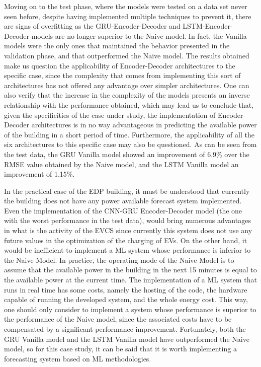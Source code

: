 Moving on to the test phase, where the models were tested on a data set never seen before, despite having implemented multiple techniques to prevent it, there are signs of overfitting as the \ac{GRU}-Encoder-Decoder  and \ac{LSTM}-Encoder-Decoder models are no longer superior to the Naive model. In fact, the Vanilla models were the only ones that maintained the behavior presented in the validation phase, and that outperformed the Naive model. The results obtained make us question the applicability of Encoder-Decoder architectures to the specific case, since the complexity that comes from implementing this sort of architectures has not offered any advantage over simpler architectures. One can also verify that the increase in the complexity of the models presents an inverse relationship with the performance obtained, which may lead us to conclude that, given the specificities of the case under study, the implementation of Encoder-Decoder architectures is in no way advantageous in predicting the available power of the building in a short period of time. Furthermore, the applicability of all the six architectures to this specific case may also be questioned. As can be seen from the test data, the \ac{GRU} Vanilla model showed an improvement of 6.9\% over the \ac{RMSE} value obtained by the Naive model, and the \ac{LSTM} Vanilla model an improvement of 1.15\%. 


 
In the practical case of the EDP building, it must be understood that currently the building does not have any power available forecast system implemented. Even the implementation of the \ac{CNN}-\ac{GRU} Encoder-Decoder model (the one with the worst performance in the test data), would bring numerous advantages in what is the activity of the \ac{EVCS} since currently this system does not use any future values in the optimization of the charging of \ac{EV}s. On the other hand, it would be inefficient to implement a \ac{ML}  system whose performance is inferior to the Naive Model. In practice, the operating mode of the Naive Model is to assume that the available power in the building in the next 15 minutes is equal to the available power at the current time. The implementation of a \ac{ML} system that runs in real time has some costs, namely the hosting of the code, the hardware capable of running the developed system, and the whole energy cost. This way, one should only consider to implement a system whose performance is superior to the performance of the Naive model, since the associated costs have to be compensated by a significant performance improvement. Fortunately, both the \ac{GRU} Vanilla model and the \ac{LSTM} Vanilla model have outperformed the Naive model, so for this case study, it can be said that it is worth implementing a forecasting system based on \ac{ML} methodologies.

